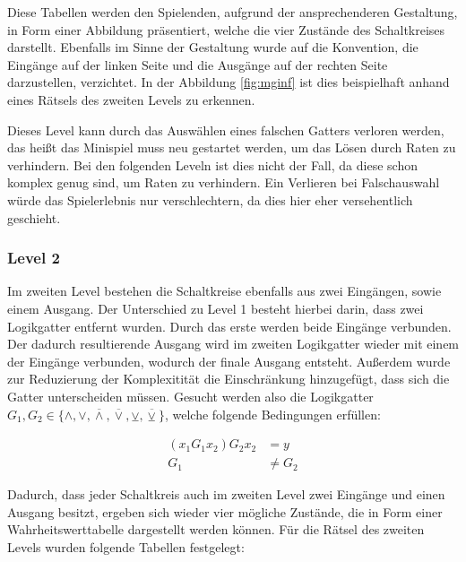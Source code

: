 Diese Tabellen werden den Spielenden, aufgrund der ansprechenderen Gestaltung, in Form einer Abbildung präsentiert, welche die vier Zustände des Schaltkreises darstellt.
Ebenfalls im Sinne der Gestaltung wurde auf die Konvention, die Eingänge auf der linken Seite und die Ausgänge auf der rechten Seite darzustellen, verzichtet.
In der Abbildung \ref{fig:mginf} ist dies beispielhaft anhand eines Rätsels des zweiten Levels zu erkennen.

Dieses Level kann durch das Auswählen eines falschen Gatters verloren werden, das heißt das Minispiel muss neu gestartet werden, um das Lösen durch Raten zu verhindern.
Bei den folgenden Leveln ist dies nicht der Fall, da diese schon komplex genug sind, um Raten zu verhindern.
Ein Verlieren bei Falschauswahl würde das Spielerlebnis nur verschlechtern, da dies hier eher versehentlich geschieht.
\subsubsection{Level 2}

Im zweiten Level bestehen die Schaltkreise ebenfalls aus zwei Eingängen, sowie einem Ausgang.
Der Unterschied zu Level 1 besteht hierbei darin, dass zwei Logikgatter entfernt wurden.
Durch das erste werden beide Eingänge verbunden.
Der dadurch resultierende Ausgang wird im zweiten Logikgatter wieder mit einem der Eingänge verbunden, wodurch der finale Ausgang entsteht.
Außerdem wurde zur Reduzierung der Komplexitität die Einschränkung hinzugefügt, dass sich die Gatter unterscheiden müssen.
Gesucht werden also die Logikgatter $G_1, G_2 \in \{\land , \lor , \overline{\land}, \overline{\lor}, \veebar, \overline{\veebar}\}$, welche folgende Bedingungen erfüllen:

\begin{align*}
    (x_1 G_1 x_2) G_2 x_2 &= y\\
    G_1 &\neq G_2
\end{align*}

Dadurch, dass jeder Schaltkreis auch im zweiten Level zwei Eingänge und einen Ausgang besitzt, ergeben sich wieder vier mögliche Zustände, die in Form einer Wahrheitswerttabelle dargestellt werden können.
Für die Rätsel des zweiten Levels wurden folgende Tabellen festgelegt:

